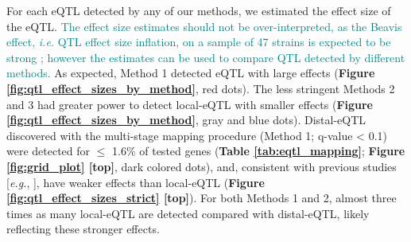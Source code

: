 \documentclass[9pt,twocolumn,twoside]{gsajnl}
\newcommand{\eg}{\emph{e.g.}\xspace}
\newcommand{\ie}{\emph{i.e.}\xspace}
\newcommand{\WV}[2]{\textcolor{red}{#1\footnote{\textcolor{red}{WV: #2}}}}
\newcommand{\GKinline}[1]{\textcolor{teal}{#1}}
\begin{document}
For each eQTL detected by any of our methods, we estimated the effect size of the eQTL. \GKinline{The effect size estimates should not be over-interpreted, as the Beavis effect, \ie QTL effect size inflation, on a sample of 47 strains is expected to be strong \citep{KeeleSPARCC}; however the estimates can be used to compare QTL detected by different methods.}
As expected, Method 1 detected eQTL with large effects (\textbf{Figure \ref{fig:qtl_effect_sizes_by_method}}, red dots). The less stringent Methods 2 and 3 had greater power to detect local-eQTL with smaller effects (\textbf{Figure \ref{fig:qtl_effect_sizes_by_method}}, gray and blue dots). Distal-eQTL discovered with the multi-stage mapping procedure (Method 1; q-value < 0.1) were detected for $\leq$ 1.6\% of tested genes (\textbf{Table \ref{tab:eqtl_mapping}}; \textbf{Figure \ref{fig:grid_plot} [top]}, dark colored dots), and, consistent with previous studies [\eg, \citet{Chick2016}], have weaker effects than local-eQTL (\textbf{Figure \ref{fig:qtl_effect_sizes_strict} [top]}). For both Methods 1 and 2, almost three times as many local-eQTL are detected compared with
distal-eQTL, likely reflecting these stronger effects. 
\end{document}
